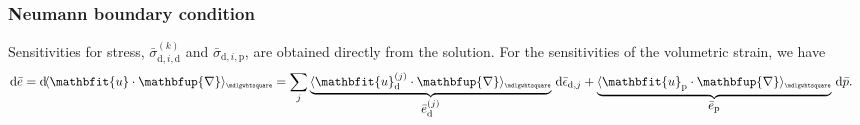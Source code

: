 \documentclass[12pt,a4paper]{article}
\renewcommand{\ta}[1]{\mathbfit{#1}}
\renewcommand{\diff}{\mathbfup{\nabla}}
\renewcommand{\Box}{\mdlgwhtsquare}
\DeclarePairedDelimiter{\homgen}{\langle}{\rangle_\rve}
\renewcommand{\dev}{\mathrm{d}}
\newcommand{\ded}{\mathrm{d}}
\newcommand{\dep}{\mathrm{p}}
\newcommand{\rve}{
  {\mathchoice
   {\mbox{\scalebox{0.67}{$\Box$}}}
   {\mbox{\scalebox{0.67}{$\Box$}}}
   {\mbox{\scalebox{0.5}{$\Box$}}}
   {\mbox{\scalebox{0.375}{$\Box$}}}
  }
}
\begin{document}
\newpage
\subsubsection{Neumann boundary condition}
Sensitivities for stress, $\bar{\sigma}_{\dev,i,\ded}^{(k)}$ and $\bar{\sigma}_{\dev,i,\dep}$, are obtained directly from the solution.
For the sensitivities of the volumetric strain, we have
\begin{align}
    \dif\bar{e}
    & = \dif \homgen{\ta u\cdot \diff}
    = \sum_j \underbrace{\homgen{\ta u_\ded^{(j)}\cdot\diff}}_{\displaystyle\bar{e}_\ded^{(j)}}\,\dif\bar{\epsilon}_{\dev,j} + 
      \underbrace{\homgen{\ta u_\dep\cdot\diff}}_{\displaystyle\bar{e}_\dep}\,\dif\bar{p}.
\end{align}
\end{document}
